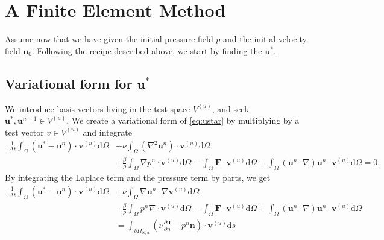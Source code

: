 \documentclass[a4paper,10pt]{article}
\renewcommand{\vec}[1]{\mathbf{#1}}
\renewcommand{\(}{\left(}
\renewcommand{\)}{\right)}
\newcommand{\dm}[1]{\text{d}#1}
\newcommand{\dpart}[2]{\frac{\partial#1}{\partial#2}}
\begin{document}
\section{A Finite Element Method}
Assume now that we have given the initial pressure field $p$ and the initial velocity field $\vec u_0$. Following the recipe described above, we start by finding the $\vec u^*$. 
\subsection{Variational form for $\vec u^*$}
We introduce basis vectors living in the test space $V^{(u)}$, and seek $\vec u^*, \vec u^{n+1} \in V^{(u)}$. We create a variational form of \eqref{eq:ustar} by multiplying by a test vector $v\in V^{(u)}$ and integrate
\begin{align*}
  \frac{1}{\Delta t}\int_\Omega(\vec u^* - \vec u^{n})\cdot\vec v^{(u)}\dm \Omega
  &- \nu\int_\Omega (\nabla^2\vec u^n)\cdot\vec v^{(u)} \dm \Omega\\
   &+ \frac{\beta}{\rho}\int_\Omega\nabla p^n \cdot\vec v^{(u)} \dm \Omega 
   - \int_\Omega\vec F\cdot\vec v^{(u)} \dm \Omega 
   + \int_\Omega(\vec u^n\cdot \nabla)\vec u^n\cdot\vec v^{(u)} \dm \Omega = 0.
\end{align*}
By integrating the Laplace term and the pressure term by parts, we get
\begin{align}
  \label{eq:ustar_variational_form}
  \frac{1}{\Delta t}\int_\Omega(\vec u^* - \vec u^{n})\cdot\vec v^{(u)}\dm \Omega
  &+ \nu\int_\Omega\nabla\vec u^n\cdot\nabla\vec v^{(u)} \dm \Omega\\
   &- \frac{\beta}{\rho}\int_\Omega p^n \nabla\cdot\vec v^{(u)} \dm \Omega 
   - \int_\Omega\vec F\cdot\vec v^{(u)} \dm \Omega 
   + \int_\Omega (\vec u^n\cdot \nabla)\vec u^n\cdot\vec v^{(u)} \dm \Omega\\
   &= \int_{\partial\Omega_{N,u}} (\nu\dpart{\vec u}{n} - p^n\vec n)\cdot\vec v^{(u)} \dm s
\end{align}
\end{document}
